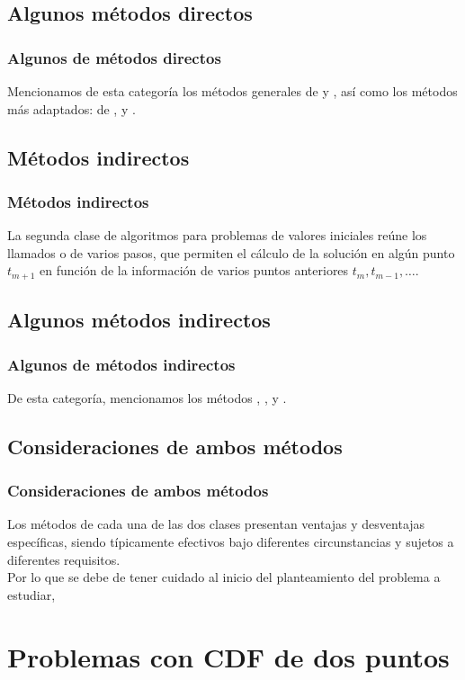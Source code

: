 \subsection*{Algunos métodos directos}
\begin{frame}
\frametitle{Algunos de métodos directos}
Mencionamos de esta categoría los métodos generales de  y , así como los métodos más adaptados: de ,  y .
\end{frame}
\subsection*{Métodos indirectos}
\begin{frame}
\frametitle{Métodos indirectos}
La segunda clase de algoritmos para problemas de valores iniciales reúne los llamados  o de varios pasos, que permiten el cálculo de la solución en algún punto $t_{m+1}$ en función de la información de varios puntos anteriores $t_{m}, t_{m-1}, \ldots$.
\end{frame}
\subsection*{Algunos métodos indirectos}
\begin{frame}
\frametitle{Algunos de métodos indirectos}
De esta categoría, mencionamos los métodos , ,  y .
\end{frame}
\subsection*{Consideraciones de ambos métodos}
\begin{frame}
\frametitle{Consideraciones de ambos métodos}
Los métodos de cada una de las dos clases presentan ventajas y desventajas específicas, siendo típicamente efectivos bajo diferentes circunstancias y sujetos a diferentes requisitos.
\\
\bigskip
Por lo que se debe de tener cuidado al inicio del planteamiento del problema a estudiar,
\end{frame}
\section{Problemas con CDF de dos puntos}
